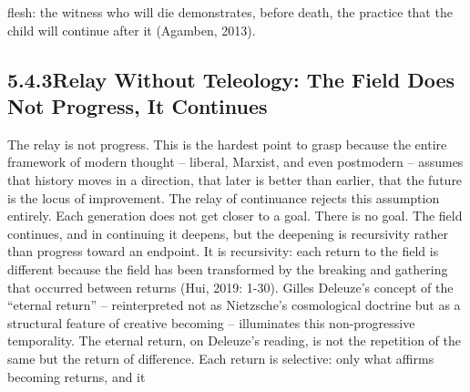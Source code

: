 flesh: the witness who will die demonstrates, before death, the practice that the child will continue after it (Agamben, 2013).

\subsection{5.4.3\quad Relay Without Teleology: The Field Does Not Progress, It Continues}

The relay is not progress. This is the hardest point to grasp because the entire framework of modern thought – liberal, Marxist, and even postmodern – assumes that history moves in a direction, that later is better than earlier, that the future is the locus of improvement. The relay of continuance rejects this assumption entirely. Each generation does not get closer to a goal. There is no goal. The field continues, and in continuing it deepens, but the deepening is recursivity rather than progress toward an endpoint. It is recursivity: each return to the field is different because the field has been transformed by the breaking and gathering that occurred between returns (Hui, 2019: 1-30). Gilles Deleuze’s concept of the “eternal return” – reinterpreted not as Nietzsche’s cosmological doctrine but as a structural feature of creative becoming – illuminates this non-progressive temporality. The eternal return, on Deleuze’s reading, is not the repetition of the same but the return of difference. Each return is selective: only what affirms becoming returns, and it

